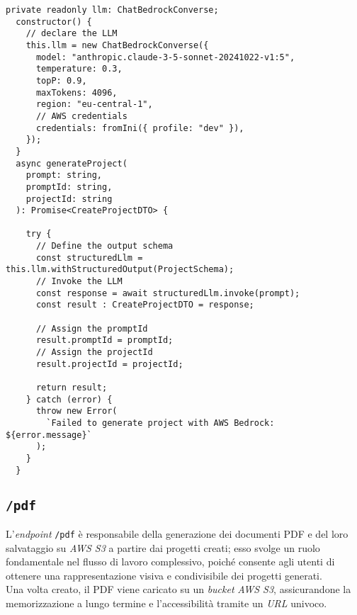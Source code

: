 \begin{lstlisting}[caption={Dichiarazione \gls{llm} e sua invocazione}, label={lst:funzione-generazione-progetto}]
private readonly llm: ChatBedrockConverse;
  constructor() {  
    // declare the LLM
    this.llm = new ChatBedrockConverse({
      model: "anthropic.claude-3-5-sonnet-20241022-v1:5",
      temperature: 0.3,
      topP: 0.9,
      maxTokens: 4096,
      region: "eu-central-1",
      // AWS credentials
      credentials: fromIni({ profile: "dev" }), 
    });
  }
  async generateProject(
    prompt: string,
    promptId: string,
    projectId: string
  ): Promise<CreateProjectDTO> {

    try {
      // Define the output schema
      const structuredLlm = this.llm.withStructuredOutput(ProjectSchema); 
      // Invoke the LLM
      const response = await structuredLlm.invoke(prompt); 
      const result : CreateProjectDTO = response;

      // Assign the promptId
      result.promptId = promptId; 
      // Assign the projectId
      result.projectId = projectId; 

      return result;
    } catch (error) {
      throw new Error(
        `Failed to generate project with AWS Bedrock: ${error.message}`
      );
    }
  }
\end{lstlisting}
\pagebreak
\subsection*{\texttt{/pdf}}
L’\textit{endpoint} \texttt{/pdf} è responsabile della generazione dei documenti PDF e del loro salvataggio su \textit{AWS S3} a partire dai progetti creati; esso svolge un ruolo fondamentale nel flusso di lavoro complessivo, poiché consente agli utenti di ottenere una rappresentazione visiva e condivisibile dei progetti generati.\\
Una volta creato, il PDF viene caricato su un \textit{bucket} \textit{AWS S3}, assicurandone la memorizzazione a lungo termine e l’accessibilità tramite un \textit{URL} univoco.\\ 

